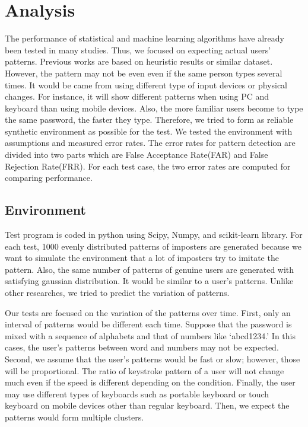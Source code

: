 \documentclass[twocolumn,showpacs,%
  nofootinbib,aps,%
  eqsecnum,prd,notitlepage,showkeys,10pt]{revtex4-1}
\begin{document}
\section{Analysis}
The performance of statistical and machine learning algorithms have already been tested in many studies. Thus, we focused on expecting actual users' patterns. Previous works are based on heuristic results or similar dataset. However, the pattern may not be even even if the same person types several times. It would be came from using different type of input devices or physical changes. For instance, it will show different patterns when using PC and keyboard than using mobile devices. Also, the more familiar users become to type the same password, the faster they type. Therefore, we tried to form as reliable synthetic environment as possible for the test. We tested the environment with assumptions and measured error rates. The error rates for pattern detection are divided into two parts which are False Acceptance Rate(FAR) and False Rejection Rate(FRR)\cite{cho2000web}. For each test case, the two error rates are computed for comparing performance.

\subsection{Environment}
Test program is coded in python using Scipy, Numpy, and scikit-learn library. For each test, 1000 evenly distributed patterns of imposters are generated because we want to simulate the environment that a lot of imposters try to imitate the pattern. Also, the same number of patterns of genuine users are generated with satisfying gaussian distribution. It would be similar to a user's patterns. Unlike other researches, we tried to predict the variation of patterns.\par
Our tests are focused on the variation of the patterns over time. First, only an interval of patterns would be different each time. Suppose that the password is mixed with a sequence of alphabets and that of numbers like `abcd1234.' In this cases, the user's patterns between word and numbers may not be expected. Second, we assume that the user's patterns would be fast or slow; however, those will be proportional. The ratio of keystroke pattern of a user will not change much even if the speed is different depending on the condition. Finally, the user may use different types of keyboards such as portable keyboard or touch keyboard on mobile devices other than regular keyboard. Then, we expect the patterns would form multiple clusters.
\end{document}
